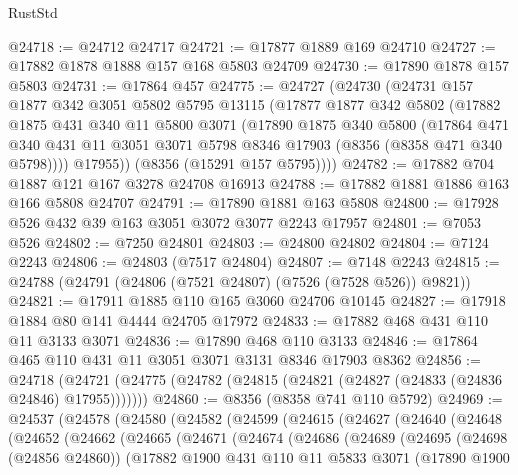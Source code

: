 \begin{lexlean}{RustStd}
\begin{coremodule}
@24718 := @24712 @24717
@24721 := @17877 @1889 @169 @24710
@24727 := @17882 @1878 @1888 @157 @168 @5803 @24709
@24730 := @17890 @1878 @157 @5803
@24731 := @17864 @457
@24775 := @24727
    (@24730
      (@24731
        @157
        @1877
        @342
        @3051
        @5802
        @5795
        @13115
        (@17877
          @1877
          @342
          @5802
          (@17882
            @1875
            @431
            @340
            @11
            @5800
            @3071
            (@17890
              @1875
              @340
              @5800
              (@17864
                @471
                @340
                @431
                @11
                @3051
                @3071
                @5798
                @8346
                @17903
                (@8356 (@8358 @471 @340 @5798))))
            @17955))
        (@8356 (@15291 @157 @5795))))
@24782 := @17882 @704 @1887 @121 @167 @3278 @24708 @16913
@24788 := @17882 @1881 @1886 @163 @166 @5808 @24707
@24791 := @17890 @1881 @163 @5808
@24800 := @17928 @526 @432 @39 @163 @3051 @3072 @3077 @2243 @17957
@24801 := @7053 @526
@24802 := @7250 @24801
@24803 := @24800 @24802
@24804 := @7124 @2243
@24806 := @24803 (@7517 @24804)
@24807 := @7148 @2243
@24815 := @24788 (@24791 (@24806 (@7521 @24807) (@7526 (@7528 @526)) @9821))
@24821 := @17911 @1885 @110 @165 @3060 @24706 @10145
@24827 := @17918 @1884 @80 @141 @4444 @24705 @17972
@24833 := @17882 @468 @431 @110 @11 @3133 @3071
@24836 := @17890 @468 @110 @3133
@24846 := @17864 @465 @110 @431 @11 @3051 @3071 @3131 @8346 @17903 @8362
@24856 := @24718
    (@24721 (@24775 (@24782 (@24815 (@24821 (@24827 (@24833 (@24836 @24846) @17955)))))))
@24860 := @8356 (@8358 @741 @110 @5792)
@24969 := @24537
    (@24578
      (@24580
        (@24582
          (@24599
            (@24615
              (@24627
                (@24640
                  (@24648
                    (@24652
                      (@24662
                        (@24665
                          (@24671
                            (@24674
                              (@24686
                                (@24689
                                  (@24695
                                    (@24698 (@24856 @24860))
                                    (@17882
                                      @1900
                                      @431
                                      @110
                                      @11
                                      @5833
                                      @3071
                                      (@17890
                                        @1900

\end{coremodule}
\end{lexlean}
